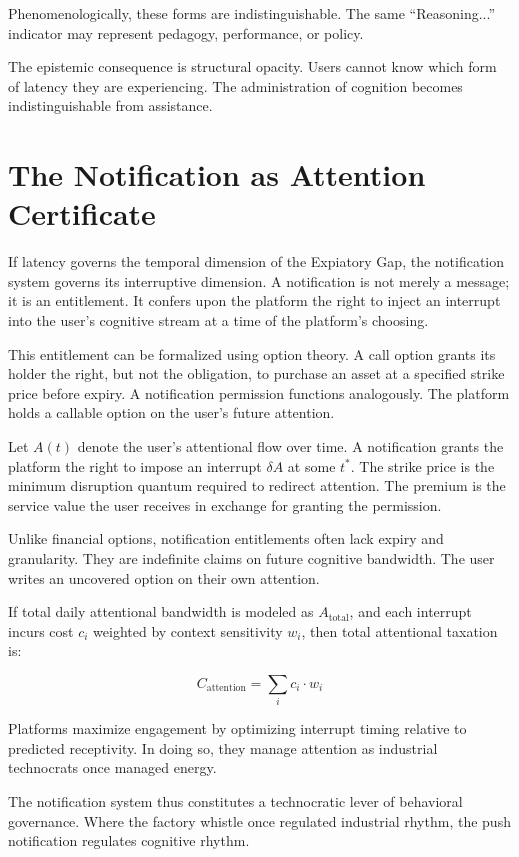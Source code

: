 \documentclass[12pt]{article}
\begin{document}
Phenomenologically, these forms are indistinguishable. The same ``Reasoning...'' indicator may represent pedagogy, performance, or policy.

The epistemic consequence is structural opacity. Users cannot know which form of latency they are experiencing. The administration of cognition becomes indistinguishable from assistance.

\section{The Notification as Attention Certificate}

If latency governs the temporal dimension of the Expiatory Gap, the notification system governs its interruptive dimension. A notification is not merely a message; it is an entitlement. It confers upon the platform the right to inject an interrupt into the user’s cognitive stream at a time of the platform’s choosing.

This entitlement can be formalized using option theory. A call option grants its holder the right, but not the obligation, to purchase an asset at a specified strike price before expiry. A notification permission functions analogously. The platform holds a callable option on the user’s future attention.

Let $A(t)$ denote the user’s attentional flow over time. A notification grants the platform the right to impose an interrupt $\delta A$ at some $t^\ast$. The strike price is the minimum disruption quantum required to redirect attention. The premium is the service value the user receives in exchange for granting the permission.

Unlike financial options, notification entitlements often lack expiry and granularity. They are indefinite claims on future cognitive bandwidth. The user writes an uncovered option on their own attention.

If total daily attentional bandwidth is modeled as $A_{\text{total}}$, and each interrupt incurs cost $c_i$ weighted by context sensitivity $w_i$, then total attentional taxation is:

\[
C_{\text{attention}} = \sum_i c_i \cdot w_i
\]

Platforms maximize engagement by optimizing interrupt timing relative to predicted receptivity. In doing so, they manage attention as industrial technocrats once managed energy.

The notification system thus constitutes a technocratic lever of behavioral governance. Where the factory whistle once regulated industrial rhythm, the push notification regulates cognitive rhythm.
\end{document}
